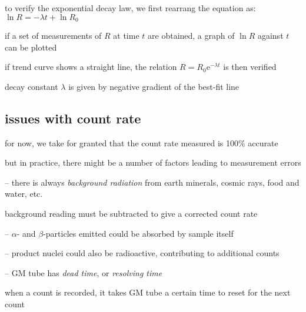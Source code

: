 \begin{marginfigure}
	\vspace*{-8pt}
	\centering
	\vspace*{-12pt}
\end{marginfigure}

to verify the exponential decay law, we first rearrang the equation as: $\ln R = -\lambda t + \ln R_0$

if a set of measurements of $R$ at time $t$ are obtained, a graph of $\ln R$ against $t$ can be plotted

if trend curve shows a straight line, the relation $R=R_0\mathrm{e}^{-\lambda t}$ is then verified

decay constant $\lambda$ is given by negative gradient of the best-fit line

\subsection*{issues with count rate}

for now, we take for granted that the count rate measured is 100\% accurate

but in practice, there might be a number of factors leading to measurement errors

\begin{compactenum}
	\item[--] there is always \emph{background radiation} from earth minerals, cosmic rays, food and water, etc.
	
	background reading must be subtracted to give a corrected count rate
	
	\item[--] $\alpha$- and $\beta$-particles emitted could be absorbed by sample itself
	
	\item[--] product nuclei could also be radioactive, contributing to additional counts
	
	\item[--] GM tube has \emph{dead time}, or \emph{resolving time}
	
	when a count is recorded, it takes GM tube a certain time
	to reset for the next count
\end{compactenum}

